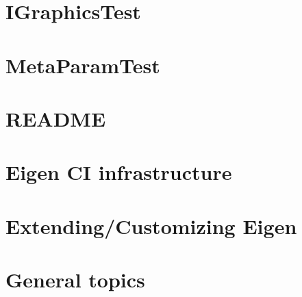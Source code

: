 \let\mypdfximage\pdfximage\def\pdfximage{\immediate\mypdfximage}\documentclass[twoside]{book}
\newcommand{\+}{\discretionary{\mbox{\scriptsize$\hookleftarrow$}}{}{}}
\begin{document}
\chapter{I\+Graphics\+Test}
\label{md__c_1__users_fab_src__github_branches__neural_amp_modeler_plugin_i_plug2__tests__i_graphics_test__r_e_a_d_m_e}

\chapter{Meta\+Param\+Test}
\label{md__c_1__users_fab_src__github_branches__neural_amp_modeler_plugin_i_plug2__tests__meta_param_test__r_e_a_d_m_e}

\chapter{R\+E\+A\+D\+ME}
\label{md__c_1__users_fab_src__github_branches__neural_amp_modeler_plugin_i_plug2__tests__r_e_a_d_m_e}

\chapter{Eigen CI infrastructure}
\label{md__c_1__users_fab_src__github_branches__neural_amp_modeler_plugin_eigen_ci__r_e_a_d_m_e}

\chapter{Extending/\+Customizing Eigen}
\label{_user_manual__customizing_eigen}

\chapter{General topics}
\label{_user_manual__generalities}

\end{document}
